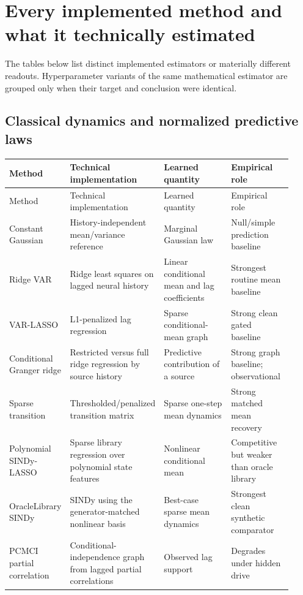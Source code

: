 \documentclass[10pt]{article}
\begin{document}
\section{Every implemented method and what it technically estimated}

The tables below list distinct implemented estimators or materially different readouts. Hyperparameter variants of the same mathematical estimator are grouped only when their target and conclusion were identical.

\subsection{Classical dynamics and normalized predictive laws}

\begin{longtable}{L{0.18\linewidth}L{0.27\linewidth}L{0.25\linewidth}L{0.22\linewidth}}
\toprule
Method & Technical implementation & Learned quantity & Empirical role \\
\midrule
\endfirsthead
\toprule Method & Technical implementation & Learned quantity & Empirical role \\
\midrule\endhead
Constant Gaussian & History-independent mean/variance reference & Marginal Gaussian law & Null/simple prediction baseline \\
Ridge VAR & Ridge least squares on lagged neural history & Linear conditional mean and lag coefficients & Strongest routine mean baseline \\
VAR-LASSO & L1-penalized lag regression & Sparse conditional-mean graph & Strong clean gated baseline \\
Conditional Granger ridge & Restricted versus full ridge regression by source history & Predictive contribution of a source & Strong graph baseline; observational \\
Sparse transition & Thresholded/penalized transition matrix & Sparse one-step mean dynamics & Strong matched mean recovery \\
Polynomial SINDy-LASSO & Sparse library regression over polynomial state features & Nonlinear conditional mean & Competitive but weaker than oracle library \\
OracleLibrary SINDy & SINDy using the generator-matched nonlinear basis & Best-case sparse mean dynamics & Strongest clean synthetic comparator \\
PCMCI partial correlation & Conditional-independence graph from lagged partial correlations & Observed lag support & Degrades under hidden drive \\

\end{longtable}
\end{document}
